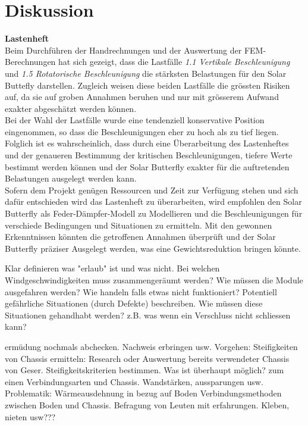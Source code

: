 
\section{Diskussion}
\label{Diskussion}

\textbf{Lastenheft}\\
Beim Durchführen der Handrechnungen und der Auswertung der FEM-Berechnungen hat sich gezeigt, dass die Lastfälle \emph{1.1 Vertikale Beschleunigung} und \emph{1.5 Rotatorische Beschleunigung} die stärksten Belastungen für den Solar Buttefly darstellen. Zugleich weisen diese beiden Lastfälle die grössten Risiken auf, da sie auf groben Annahmen beruhen und nur mit grösserem Aufwand exakter abgeschätzt werden können.\\
Bei der Wahl der Lastfälle wurde eine tendenziell konservative Position eingenommen, so dass die Beschleunigungen eher zu hoch als zu tief liegen. Folglich ist es wahrscheinlich, dass durch eine Überarbeitung des Lastenheftes und der genaueren Bestimmung der kritischen Beschleunigungen, tiefere Werte bestimmt werden können und der Solar Butterfly exakter für die auftretenden Belastungen ausgelegt werden kann.\\
Sofern dem Projekt genügen Ressourcen und Zeit zur Verfügung stehen und sich dafür entschieden wird das Lastenheft zu überarbeiten, wird empfohlen den Solar Butterfly als Feder-Dämpfer-Modell zu Modellieren und die Beschleunigungen für verschiede Bedingungen und Situationen zu ermitteln. Mit den gewonnen Erkenntnissen könnten die getroffenen Annahmen überprüft und der Solar Butterfly präziser Ausgelegt werden, was eine Gewichtsreduktion bringen könnte. 


Klar definieren was "erlaub" ist und was nicht. Bei welchen Windgeschwindigkeiten muss zusammengeräumt werden? Wie müssen die Module ausgefahren werden? Wie handeln falls etwas nicht funktioniert? Potentiell gefährliche Situationen (durch Defekte) beschreiben. Wie müssen diese Situationen gehandhabt werden? z.B. was wenn ein Verschluss nicht schliessen kann?

ermüdung nochmals abchecken. Nachweis erbringen usw.
Vorgehen:
Steifigkeiten von Chassis ermitteln: Research oder Auswertung bereits verwendeter Chassis von Geser.
Steifigkeitskriterien bestimmen.
Was ist überhaupt möglich? zum einen Verbindungsarten und Chassis. Wandstärken, aussparungen usw.
Problematik: Wärmeausdehnung in bezug auf Boden
Verbindungsmethoden zwischen Boden und Chassis. Befragung von Leuten mit erfahrungen. Kleben, nieten usw???






